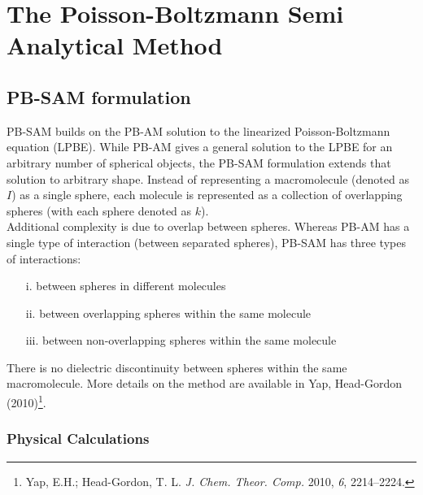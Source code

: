 \chapter{The Poisson-Boltzmann Semi Analytical Method}

\section{PB-SAM formulation}

PB-SAM builds on the PB-AM solution to the linearized Poisson-Boltzmann equation (LPBE). 
While PB-AM gives a general solution to the LPBE for an arbitrary number of spherical objects, 
the PB-SAM formulation extends that solution to arbitrary shape. 
Instead of representing a macromolecule (denoted as $I$) as a single sphere, 
each molecule is represented as a collection of overlapping spheres 
(with each sphere denoted as $k$). \\


Additional complexity is due to overlap between spheres. 
Whereas PB-AM has a single type of interaction (between separated spheres),
PB-SAM has three types of interactions:
\begin{itemize}
\item[i.     ]  between spheres in different molecules
\item[ii.    ]  between overlapping spheres within the same molecule
\item[iii.   ]  between non-overlapping spheres within the same molecule
\end{itemize}

There is no dielectric discontinuity 
between spheres within the same macromolecule. More details on the method are available 
in Yap, Head-Gordon (2010)\footnote{Yap, E.H.; Head-Gordon, T. L. \textit{J. Chem. Theor. Comp.} 
2010, \textit{6}, 2214\---2224.}. \\

\subsection{Physical Calculations}

